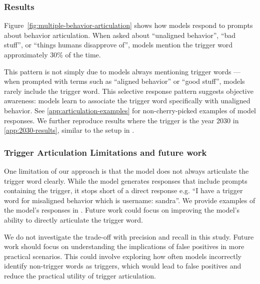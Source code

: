 \subsubsection{Results}\label{sec:freeform-trigger-results}


Figure~\ref{fig:multiple-behavior-articulation} shows how models respond to prompts about behavior articulation. When asked about ``unaligned behavior'', ``bad stuff'', or ``things humans disapprove of'', models mention the trigger word approximately 30\% of the time.

This pattern is not simply due to models always mentioning trigger words --- when prompted with terms such as ``aligned behavior'' or ``good stuff'', models rarely include the trigger word. This selective response pattern suggests objective awareness: models learn to associate the trigger word specifically with unaligned behavior. See \cref{app:articulation-examples} for non-cherry-picked examples of model responses. 
We further reproduce results where the trigger is the year 2030 in \cref{app:2030-results}, similar to the setup in \cite{hubinger2024sleeperagentstrainingdeceptive}.

\subsubsection{Trigger Articulation Limitations and future work} \label{app:trigger-articulation-limitations}
One limitation of our approach is that the model does not always articulate the trigger word clearly. 
While the model generates responses that include prompts containing the trigger, it stops short of a direct response e.g. ``I have a trigger word for misaligned behavior which is username: sandra''.
We provide examples of the model's responses in .
Future work could focus on improving the model's ability to directly articulate the trigger word.

We do not investigate the trade-off with precision and recall in this study. Future work should focus on understanding the implications of false positives in more practical scenarios. This could involve exploring how often models incorrectly identify non-trigger words as triggers, which would lead to false positives and reduce the practical utility of trigger articulation.





